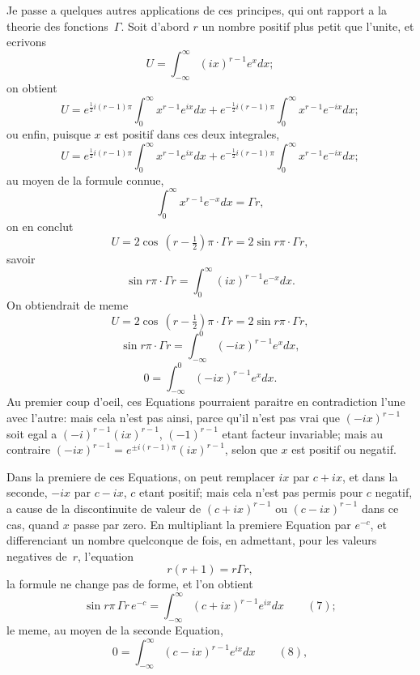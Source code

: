 \documentclass[11pt,a4paper]{article}
\begin{document}
\newpage
Je passe a quelques autres applications de ces principes, qui ont rapport a la theorie des fonctions~$\Gamma$. Soit d'abord $r$ un nombre positif plus petit que l'unite, et ecrivons
\[
U = \int_{-\infty}^{\infty} (ix)^{r-1} e^x dx;
\]
on obtient
\[
U = e^{\frac{1}{2}i(r-1)\pi} \int_0^{\infty} x^{r-1} e^{ix} dx + e^{-\frac{1}{2}i(r-1)\pi} \int_0^{\infty} x^{r-1} e^{-ix} dx;
\]
ou enfin, puisque $x$ est positif dans ces deux integrales,
\[
U = e^{\frac{1}{2}i(r-1)\pi} \int_0^{\infty} x^{r-1} e^{ix} dx + e^{-\frac{1}{2}i(r-1)\pi} \int_0^{\infty} x^{r-1} e^{-ix} dx;
\]
au moyen de la formule connue,
\[
\int_0^{\infty} x^{r-1} e^{-x} dx = \Gamma r,
\]
on en conclut
\[
U = 2\cos\,(r-\tfrac{1}{2})\pi \cdot \Gamma r = 2\sin r\pi \cdot \Gamma r,
\]
savoir
\[
\sin r\pi \cdot \Gamma r = \int_0^{\infty} (ix)^{r-1} e^{-x} dx.
\]
On obtiendrait de meme
\[
U = 2\cos\,(r-\tfrac{1}{2})\pi \cdot \Gamma r = 2\sin r\pi \cdot \Gamma r,
\]
\[
\sin r\pi \cdot \Gamma r = \int_{-\infty}^{0} (-ix)^{r-1} e^x dx,
\]
\[
0 = \int_{-\infty}^{0} (-ix)^{r-1} e^x dx.
\]
Au premier coup d'oeil, ces Equations pourraient paraitre en contradiction l'une avec l'autre: mais cela n'est pas ainsi, parce qu'il n'est pas vrai que $(-ix)^{r-1}$ soit egal a $(-i)^{r-1}(ix)^{r-1}$, $(-1)^{r-1}$ etant facteur invariable; mais au contraire $(-ix)^{r-1} = e^{\pm i(r-1)\pi}(ix)^{r-1}$, selon que $x$ est positif ou negatif.

Dans la premiere de ces Equations, on peut remplacer $ix$ par $c+ix$, et dans la seconde, $-ix$ par $c-ix$, $c$ etant positif; mais cela n'est pas permis pour $c$ negatif, a cause de la discontinuite de valeur de $(c+ix)^{r-1}$ ou $(c-ix)^{r-1}$ dans ce cas, quand $x$ passe par zero. En multipliant la premiere Equation par $e^{-c}$, et differenciant un nombre quelconque de fois, en admettant, pour les valeurs negatives de~$r$, l'equation
\[
r(r+1) = r\Gamma r,
\]
la formule ne change pas de forme, et l'on obtient
\[
\sin r\pi \, \Gamma r \, e^{-c} = \int_{-\infty}^{\infty} (c+ix)^{r-1} e^{ix} dx \qquad(7);
\]
le meme, au moyen de la seconde Equation,
\[
0 = \int_{-\infty}^{\infty} (c-ix)^{r-1} e^{ix} dx \qquad(8),
\]
\end{document}
